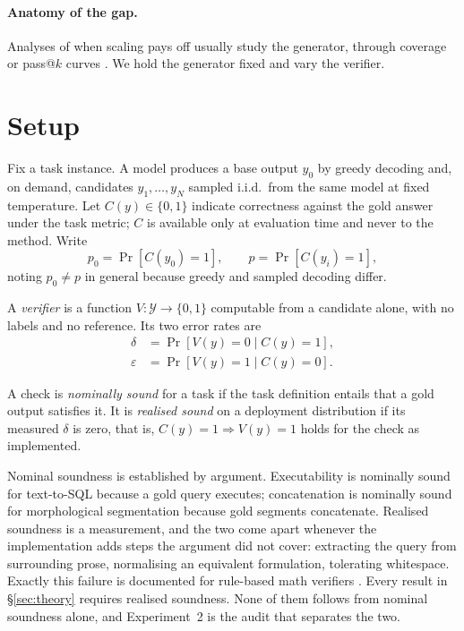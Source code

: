 \documentclass[11pt]{article}
\begin{document}
\paragraph{Anatomy of the gap.} Analyses of when scaling pays off usually study the generator, through coverage or pass@$k$ curves \citep{brown2024monkeys}. We hold the generator fixed and vary the verifier.

\section{Setup}\label{sec:setup}
Fix a task instance. A model produces a base output $y_0$ by greedy decoding and, on demand, candidates $y_1,\dots,y_N$ sampled i.i.d.\ from the same model at fixed temperature. Let $C(y)\in\{0,1\}$ indicate correctness against the gold answer under the task metric; $C$ is available only at evaluation time and never to the method. Write
\[
p_0=\Pr[C(y_0)=1],\qquad p=\Pr[C(y_i)=1],
\]
noting $p_0\neq p$ in general because greedy and sampled decoding differ.

A \emph{verifier} is a function $V:\mathcal{Y}\to\{0,1\}$ computable from a candidate alone, with no labels and no reference. Its two error rates are
\[
\begin{aligned}
\delta&=\Pr[V(y)=0\mid C(y)=1],\\
\varepsilon&=\Pr[V(y)=1\mid C(y)=0].
\end{aligned}
\]

\begin{definition}\label{def:sound}
A check is \emph{nominally sound} for a task if the task definition entails that a gold output satisfies it. It is \emph{realised sound} on a deployment distribution if its measured $\delta$ is zero, that is, $C(y)=1\Rightarrow V(y)=1$ holds for the check as implemented.
\end{definition}

Nominal soundness is established by argument. Executability is nominally sound for text-to-SQL because a gold query executes; concatenation is nominally sound for morphological segmentation because gold segments concatenate. Realised soundness is a measurement, and the two come apart whenever the implementation adds steps the argument did not cover: extracting the query from surrounding prose, normalising an equivalent formulation, tolerating whitespace. Exactly this failure is documented for rule-based math verifiers \citep{tinyv2025,cai2025noisy}. Every result in \S\ref{sec:theory} requires realised soundness. None of them follows from nominal soundness alone, and Experiment~2 is the audit that separates the two.
\end{document}
